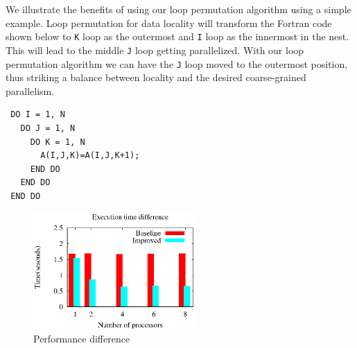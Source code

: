 
We illustrate the benefits of using our loop permutation algorithm using a simple example. Loop permutation for data locality will transform the Fortran code shown below to \texttt{K} loop as the outermost and \texttt{I} loop as the innermost in the nest. This
will lead to the middle \texttt{J} loop getting parallelized. With our loop
permutation algorithm we can have the \texttt{J} loop moved to the
outermost position, thus striking a balance between locality and the desired coarse-grained parallelism.

{\small
\begin{verbatim}
 DO I = 1, N
   DO J = 1, N
     DO K = 1, N 
       A(I,J,K)=A(I,J,K+1);
     END DO
   END DO
 END DO
\end{verbatim}
}







\begin{figure}[!t]
  \begin{center}
    \includegraphics[angle=0, width=0.55\textwidth]{compare.eps}
    \caption{\footnotesize Performance difference}
    \label{fig:compare}
  \end{center}
\end{figure}

